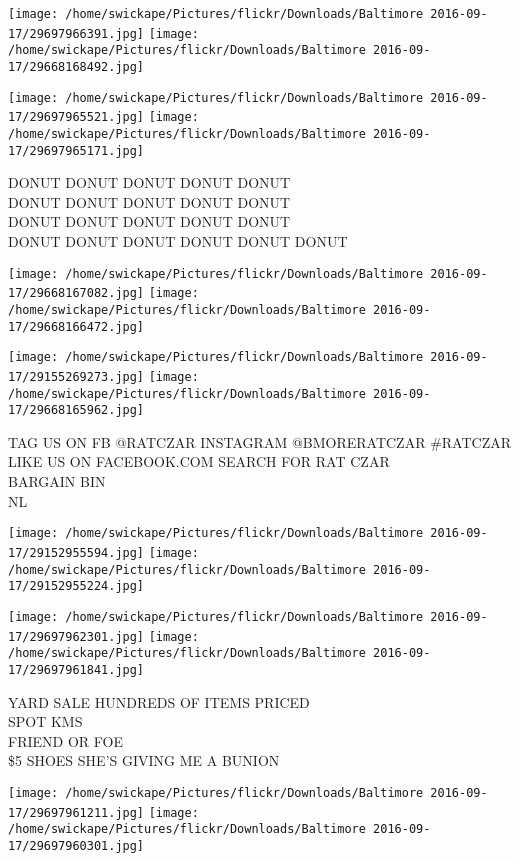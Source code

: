 \documentclass[10pt,letterpaper]{article}
\begin{document}
\texttt{[image: /home/swickape/Pictures/flickr/Downloads/Baltimore 2016-09-17/29697966391.jpg]}
\texttt{[image: /home/swickape/Pictures/flickr/Downloads/Baltimore 2016-09-17/29668168492.jpg]}

\texttt{[image: /home/swickape/Pictures/flickr/Downloads/Baltimore 2016-09-17/29697965521.jpg]}
\texttt{[image: /home/swickape/Pictures/flickr/Downloads/Baltimore 2016-09-17/29697965171.jpg]}

DONUT DONUT DONUT DONUT DONUT\\
DONUT DONUT DONUT DONUT DONUT\\
DONUT DONUT DONUT DONUT DONUT\\
DONUT DONUT DONUT DONUT DONUT DONUT
\pagebreak

\texttt{[image: /home/swickape/Pictures/flickr/Downloads/Baltimore 2016-09-17/29668167082.jpg]}
\texttt{[image: /home/swickape/Pictures/flickr/Downloads/Baltimore 2016-09-17/29668166472.jpg]}

\texttt{[image: /home/swickape/Pictures/flickr/Downloads/Baltimore 2016-09-17/29155269273.jpg]}
\texttt{[image: /home/swickape/Pictures/flickr/Downloads/Baltimore 2016-09-17/29668165962.jpg]}

TAG US ON FB @RATCZAR INSTAGRAM @BMORERATCZAR \#RATCZAR\\
LIKE US ON FACEBOOK.COM SEARCH FOR RAT CZAR\\
BARGAIN BIN\\
NL
\pagebreak

\texttt{[image: /home/swickape/Pictures/flickr/Downloads/Baltimore 2016-09-17/29152955594.jpg]}
\texttt{[image: /home/swickape/Pictures/flickr/Downloads/Baltimore 2016-09-17/29152955224.jpg]}

\texttt{[image: /home/swickape/Pictures/flickr/Downloads/Baltimore 2016-09-17/29697962301.jpg]}
\texttt{[image: /home/swickape/Pictures/flickr/Downloads/Baltimore 2016-09-17/29697961841.jpg]}

YARD SALE HUNDREDS OF ITEMS PRICED\\
SPOT KMS\\
FRIEND OR FOE\\
\$5 SHOES SHE'S GIVING ME A BUNION
\pagebreak

\texttt{[image: /home/swickape/Pictures/flickr/Downloads/Baltimore 2016-09-17/29697961211.jpg]}
\texttt{[image: /home/swickape/Pictures/flickr/Downloads/Baltimore 2016-09-17/29697960301.jpg]}
\end{document}
